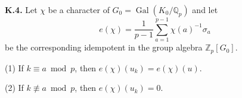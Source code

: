 \textbf{K.4.} Let $\chi$ be a character of $G_0 = \operatorname{Gal}(K_0/\mathbb{Q}_p)$ and let
$$e(\chi) = \frac{1}{p-1} \sum_{a=1}^{p-1} \chi(a)^{-1} \sigma_a$$
be the corresponding idempotent in the group algebra $\mathbb{Z}_p[G_0]$.

(1) If $k \equiv a \bmod p$, then $e(\chi)(u_k) = e(\chi)(u)$.

(2) If $k \not\equiv a \bmod p$, then $e(\chi)(u_k) = 0$.
